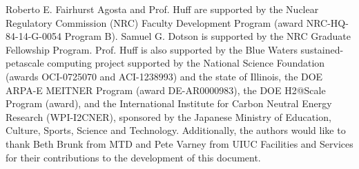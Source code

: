 \documentclass{anstrans}
\begin{document}
Roberto E. Fairhurst Agosta and Prof. Huff are supported by the Nuclear Regulatory Commission (NRC) Faculty Development Program (award NRC-HQ-84-14-G-0054 Program B). Samuel G. Dotson is supported by the NRC Graduate Fellowship Program. Prof. Huff is also supported by the Blue Waters sustained-petascale computing project supported by the National Science Foundation (awards OCI-0725070 and ACI-1238993) and the state of Illinois, the DOE ARPA-E MEITNER Program (award DE-AR0000983), the DOE H2@Scale Program (award), and the International Institute for Carbon Neutral Energy Research (WPI-I2CNER), sponsored by the Japanese Ministry of Education, Culture, Sports, Science and Technology.
Additionally, the authors would like to thank Beth Brunk from MTD and Pete Varney from UIUC Facilities and Services for their contributions to the development of this document.



\end{document}

